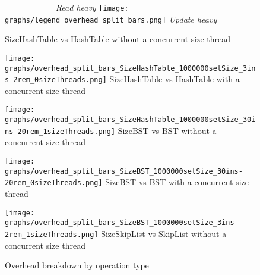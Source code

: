 \documentclass{article}
\begin{document}
\begin{figure*}
  \caption{Overhead breakdown by operation type}
  \centering
  \medskip
  \textit{\ \ \ \ \ \ \ \ \ \ \ \ Read heavy}\hfill
  \texttt{[image: graphs/legend\_overhead\_split\_bars.png]}\hfill
  \textit{Update heavy\ \ \ \ }\par
  \vspace{2mm}
  SizeHashTable vs HashTable without a concurrent size thread\par
  \vspace{2.2mm}
  \texttt{[image: graphs/overhead\_split\_bars\_SizeHashTable\_1000000setSize\_3ins-2rem\_0sizeThreads.png]}\hspace*{0.001mm}
  SizeHashTable vs HashTable with a concurrent size thread\par
  \vspace{2.2mm}
  \hspace*{0.01mm}
  \texttt{[image: graphs/overhead\_split\_bars\_SizeHashTable\_1000000setSize\_30ins-20rem\_1sizeThreads.png]}
  \label{fig:overhead breakdown}
  SizeBST vs BST without a concurrent size thread\par
  \vspace{2.2mm}
  \hspace*{0.001mm}
  \texttt{[image: graphs/overhead\_split\_bars\_SizeBST\_1000000setSize\_30ins-20rem\_0sizeThreads.png]}
  SizeBST vs BST with a concurrent size thread\par
  \vspace{2.2mm}
  \texttt{[image: graphs/overhead\_split\_bars\_SizeBST\_1000000setSize\_3ins-2rem\_1sizeThreads.png]}\hspace*{0.01mm}
  SizeSkipList vs SkipList without a concurrent size thread\par
  \vspace{2.2mm}

\end{figure*}
\end{document}
